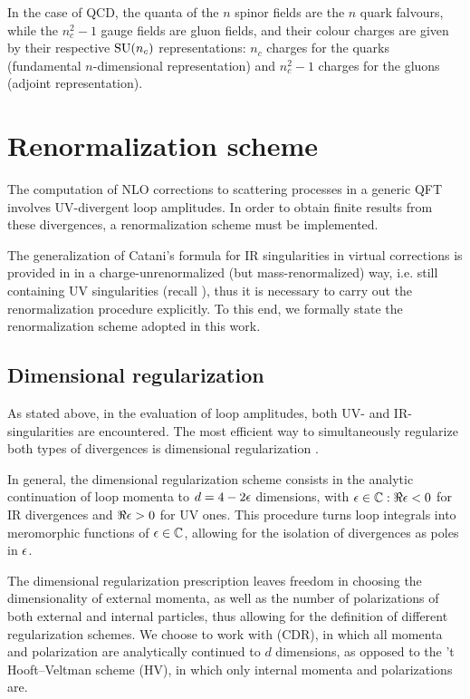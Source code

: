 In the case of QCD, the quanta of the $ n $ spinor fields are the $ n $ quark falvours, while the $ n_c^2 - 1 $ gauge fields are gluon fields, and their colour charges are given by their respective $ \mathrm{SU}(n_c) $ representations: $ n_c $ charges for the quarks (fundamental $ n $-dimensional representation) and $ n_c^2 - 1 $ charges for the gluons (adjoint representation).

\section{Renormalization scheme}
\label{sec:renorm}

The computation of NLO corrections to scattering processes in a generic QFT involves UV-divergent loop amplitudes. In order to obtain finite results from these divergences, a renormalization scheme must be implemented.

The generalization of Catani's formula for IR singularities in virtual corrections is provided in \cite{Catani-2001} in a charge-unrenormalized (but mass-renormalized) way, i.e. still containing UV singularities (recall ), thus it is necessary to carry out the renormalization procedure explicitly. To this end, we formally state the renormalization scheme adopted in this work.

\subsection{Dimensional regularization}
\label{ssec:dim-reg}

As stated above, in the evaluation of loop amplitudes, both UV- and IR-singularities are encountered. The most efficient way to simultaneously regularize both types of divergences is dimensional regularization \cite{Thooft-1972, Bollini-1972}.

In general, the dimensional regularization scheme consists in the analytic continuation of loop momenta to $ d = 4 - 2 \epsilon $ dimensions, with $ \epsilon \in \mathbb{C} : \Re\epsilon < 0 $ for IR divergences and $ \Re\epsilon > 0 $ for UV ones. This procedure turns loop integrals into meromorphic functions of $ \epsilon \in \mathbb{C} $, allowing for the isolation of divergences as poles in $ \epsilon $.

The dimensional regularization prescription leaves freedom in choosing the dimensionality of external momenta, as well as the number of polarizations of both external and internal particles, thus allowing for the definition of different regularization schemes. We choose to work with  (CDR), in which all momenta and polarization are analytically continued to $ d $ dimensions, as opposed to the 't Hooft--Veltman scheme (HV), in which only internal momenta and polarizations are.

